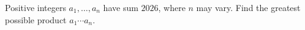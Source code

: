 Positive integers $a_1,\ldots,a_n$ have sum $2026$, where $n$ may vary. Find the greatest possible product $a_1\cdots a_n$.
